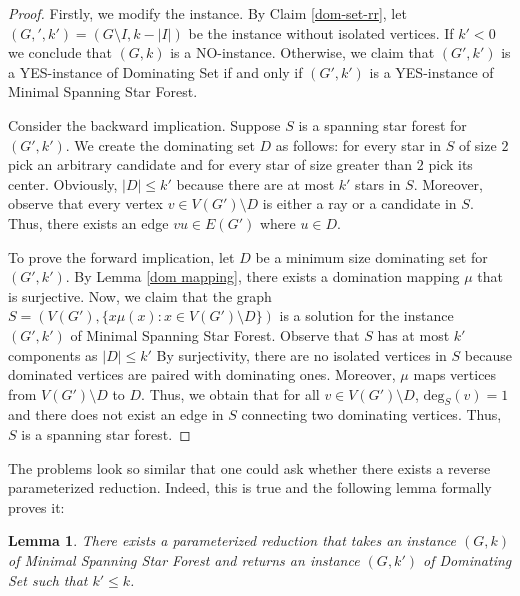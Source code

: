 \documentclass[en]{pracamgr}
\newtheorem{lemma}{Lemma}
\theoremstyle{definition}
\newcommand{\mssfp}{{\sc Minimal Spanning Star Forest}}
\newcommand{\domset}{dominating set}
\newcommand{\domsetp}{{\sc Dominating Set}}
\newcommand{\degree}[2]{\textrm{deg}_{#1}(#2)}
\begin{document}
\begin{proof}
	Firstly, we modify the instance. By Claim \ref{dom-set-rr}, let $(G,',k')=(G \setminus I, k - |I|)$ be the instance without isolated vertices. If $k' < 0$ we conclude that $(G,k)$ is a NO-instance. Otherwise, we claim that $(G',k')$ is a YES-instance of \domsetp{} if and only if $(G',k')$ is a YES-instance of \mssfp{}. 
	
	Consider the backward implication. Suppose $S$ is a spanning star forest for $(G',k')$. We create the \domset{} $D$ as follows: for every star in $S$ of size $2$ pick an arbitrary candidate and for every star of size greater than $2$ pick its center. Obviously, $|D| \leq k'$ because there are at most $k'$ stars in $S$. Moreover, observe that every vertex $v \in V(G') \setminus D$ is either a ray or a candidate in $S$. Thus, there exists an edge $vu \in E(G')$ where $u \in D$.
	
	To prove the forward implication, let $D$ be a minimum size dominating set for $(G',k')$. By Lemma \ref{dom mapping}, there exists a domination mapping $\mu$ that is surjective. Now, we claim that the graph $S=(V(G'),\{x\mu(x): x \in V(G') \setminus D\})$ is a solution for the instance $(G',k')$ of \mssfp{}. Observe that $S$ has at most $k'$ components as $|D| \leq k'$ By surjectivity, there are no isolated vertices in $S$ because dominated vertices are paired with dominating ones. Moreover, $\mu$ maps vertices from $V(G') \setminus D$ to $D$. Thus, we obtain that for all $v \in V(G') \setminus D$, $\degree{S}{v}=1$ and there does not exist an edge in $S$ connecting two dominating vertices. Thus, $S$ is a spanning star forest.
\end{proof}

The problems look so similar that one could ask whether there exists a reverse parameterized reduction. Indeed, this is true and the following lemma formally proves it:

\begin{lemma}\label{ssf-dom reduction}
	There exists a parameterized reduction that takes an instance $(G,k)$ of \mssfp{} and returns an instance $(G,k')$ of \domsetp{} such that $k' \leq k$. 
\end{lemma}
\end{document}
